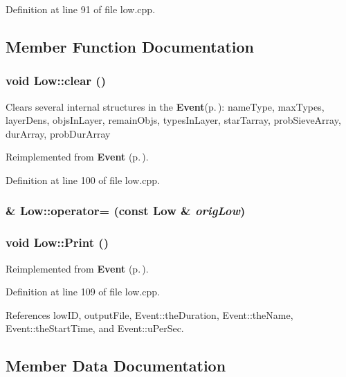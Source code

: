 Definition at line 91 of file low.cpp.

\subsection{Member Function Documentation}
\subsubsection{\setlength{\rightskip}{0pt plus 5cm}void Low::clear ()\hspace{0.3cm}{\tt  [virtual]}}\label{classLow_a4}


Clears several internal structures in the {\bf Event}{\rm (p.\,\pageref{classEvent})}: name\-Type, max\-Types, layer\-Dens, objs\-In\-Layer, remain\-Objs, types\-In\-Layer, star\-Tarray, prob\-Sieve\-Array, dur\-Array, prob\-Dur\-Array 

Reimplemented from {\bf Event} {\rm (p.\,\pageref{classEvent_a12})}.

Definition at line 100 of file low.cpp.
\subsubsection{\& Low::operator= (const {\bf Low} \& {\em orig\-Low})}\label{classLow_a3}


\subsubsection{\setlength{\rightskip}{0pt plus 5cm}void Low::Print ()\hspace{0.3cm}{\tt  [virtual]}}\label{classLow_a5}




Reimplemented from {\bf Event} {\rm (p.\,\pageref{classEvent_a57})}.

Definition at line 109 of file low.cpp.

References low\-ID, output\-File, Event::the\-Duration, Event::the\-Name, Event::the\-Start\-Time, and Event::u\-Per\-Sec.

\subsection{Member Data Documentation}
